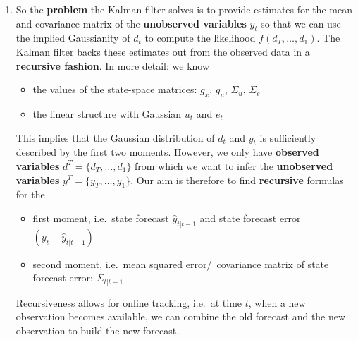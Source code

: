 \begin{enumerate}
\item So the \textbf{problem} the Kalman filter solves is to provide estimates for the mean and covariance matrix of the \textbf{unobserved variables} \(y_{t}\)
  so that we can use the implied Gaussianity of \(d_t\) to compute the likelihood \(f(d_T,\ldots ,d_1)\).
The Kalman filter backs these estimates out from the observed data in a \textbf{recursive fashion}.
In more detail: we know
\begin{itemize}
\item the values of the state-space matrices: \(g_x\), \(g_u\), \(\Sigma_u\), \(\Sigma_e\)
\item the linear structure with Gaussian \(u_t\) and \(e_t\)
\end{itemize}
This implies that the Gaussian distribution of \(d_t\) and \(y_t\) is sufficiently described by the first two moments.
However, we only have \textbf{observed variables} \(d^T = \{d_T,\ldots ,d_1\} \) from which we want to infer the \textbf{unobserved variables} \(y^T = \{y_T,\ldots ,y_1\} \).
Our aim is therefore to find \textbf{recursive} formulas for the
\begin{itemize}
\item first moment, i.e.\ state forecast \(\hat{y}_{t|t-1}\) and state forecast error \((y_t - \hat{y}_{t|t-1})\)
\item second moment, i.e.\ mean squared error\slash~covariance matrix of state forecast error: \(\Sigma_{t|t-1}\)
\end{itemize}
Recursiveness allows for online tracking, i.e.\ at time \(t\),
  when a new observation becomes available, we can combine the old forecast and the new observation to build the new forecast.


\end{enumerate}
